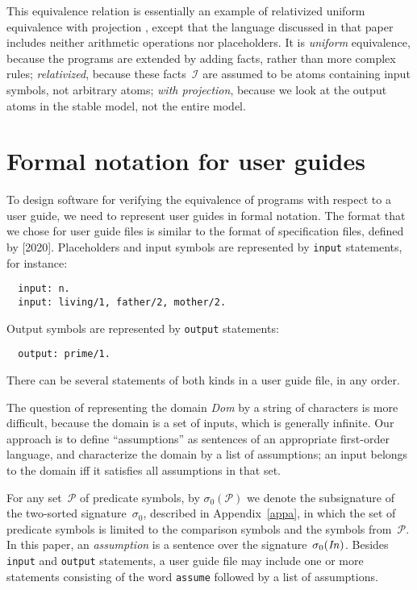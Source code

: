 \documentclass{new_tlp}
\newcommand{\I}{\mathcal{I}}
\newcommand{\PP}{\mathcal{P}}
\begin{document}
This equivalence relation is essentially an
example of relativized uniform equivalence with projection
\cite{oet08}, except that the language discussed in that paper includes
neither arithmetic operations nor placeholders.
It is \emph{uniform} equivalence, because the programs are extended by
adding facts, rather than more complex rules; \emph{relativized},
because these
  facts~$\I$ are assumed to be atoms containing input symbols,
  not arbitrary atoms; \emph{with projection}, because
  we look at the output atoms in the stable model, not the entire model.

\section{Formal notation for user guides} \label{sec:fn}

To design software for verifying the equivalence of
programs with respect to a user guide, we need to
represent user guides in formal notation.   The format that we chose for
user guide files is similar to the format of
specification files, defined by \cite{fan20} [2020].
Placeholders
and input symbols are represented by \verb|input| statements, for instance:
\begin{verbatim}
  input: n.
  input: living/1, father/2, mother/2.
\end{verbatim}
Output symbols are represented by \verb|output| statements:
\begin{verbatim}
  output: prime/1.
\end{verbatim}
There can be several statements of both kinds in a user guide file, in any
order.

The question of representing the domain \emph{Dom} by a string of
characters is more difficult, because the domain is a set of inputs,
which is generally infinite.
Our approach is to define ``assumptions'' as sentences of an
appropriate first-order language, and characterize the domain by a
list of assumptions; an input belongs to the domain iff it
satisfies all assumptions in that set.

For any set~$\PP$ of predicate symbols, by $\sigma_0(\PP)$ we denote the
subsignature of the two-sorted signature~$\sigma_0$, described in
Appendix~\ref{appa}, in which the set of predicate symbols
is limited to the comparison symbols and the symbols from~$\PP$.
In this paper, an \emph{assumption} is a sentence over the
signature~$\sigma_0(\emph{In\/})$.
Besides \verb|input| and \verb|output| statements, a user guide
file may include one or more statements consisting of the word
\verb|assume| followed by a list of assumptions.
\end{document}
